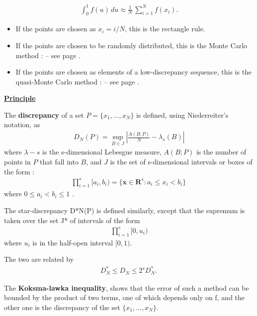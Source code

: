 {  \begin{align*}
    \int_0^1 f(u)\,du \approx \frac{1}{N}\,\sum_{i=1}^N f(x_i).
  \end{align*}
  \begin{itemize}
  \item If the points are chosen as $x_i = i/N$, this is the rectangle rule.
  \item If the points are chosen to be randomly  distributed, this is the Monte Carlo method :   -- see page \pageref{docref_C221_MonteCarloStd}.
  \item If the points are chosen as elements of a low-discrepancy sequence, this is the quasi-Monte Carlo method :   -- see page \pageref{docref_C322_QuasiMonteCarlo}.
  \end{itemize}

  \underline{\textbf{Principle}} \vspace{2mm}

  The {\bf discrepancy} of a set $P = \{x_1, \hdots, x_N\}$ is defined, using Niederreiter's notation, as
  \begin{align*}
    D_N(P) = \sup_{B\in J} \left| \frac{A(B;P)}{N} - \lambda_s(B) \right|
  \end{align*}
  where $\lambda-s$ is the s-dimensional Lebesgue measure, $A(B;P)$ is the number of points in $P$ that fall into $B$, and $J$ is the set of s-dimensional intervals or boxes of the form :
  \begin{align*}
    \prod_{i=1}^s [a_i, b_i) = \{ \mathbf{x} \in \mathbf{R}^s : a_i \le x_i < b_i \} \,
  \end{align*}
  where $0 \le a_i < b_i \le 1$ .

  The star-discrepancy D*N(P) is defined similarly, except that the supremum is taken over the set J* of intervals of the form
  \begin{align*}
    \prod_{i=1}^s [0, u_i)
  \end{align*}
  where $u_i$ is in the half-open interval $[0, 1)$.

    The two are related by
    \begin{align*}
      D^*_N \le D_N \le 2^s D^*_N . \,
    \end{align*}

    The {\bf Koksma-lawka inequality}, shows that the error of such a method can be bounded by the product of two terms, one of which depends only on f, and the other one is the discrepancy of the set $\{x_1, \hdots, x_N\}$.\\

}

